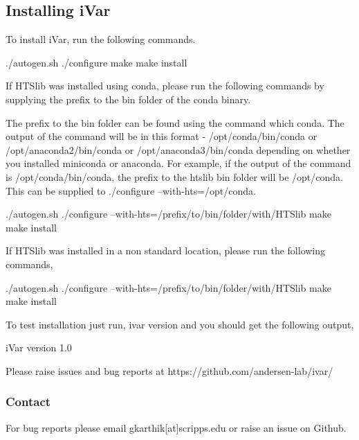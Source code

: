 \hypertarget{installpage_autotoc_md9}{}\subsection{Installing i\+Var}\label{installpage_autotoc_md9}
To install i\+Var, run the following commands.


\begin{DoxyCode}
./autogen.sh
./configure
make
make install
\end{DoxyCode}


If H\+T\+Slib was installed using conda, please run the following commands by supplying the prefix to the bin folder of the conda binary.

The prefix to the bin folder can be found using the command {\ttfamily which conda}. The output of the command will be in this format -\/ /opt/conda/bin/conda or /opt/anaconda2/bin/conda or /opt/anaconda3/bin/conda depending on whether you installed miniconda or anaconda. For example, if the output of the command is /opt/conda/bin/conda, the prefix to the htslib bin folder will be /opt/conda. This can be supplied to ./configure --with-\/hts=/opt/conda.


\begin{DoxyCode}
./autogen.sh
./configure --with-hts=/prefix/to/bin/folder/with/HTSlib
make
make install
\end{DoxyCode}


If H\+T\+Slib was installed in a non standard location, please run the following commands,


\begin{DoxyCode}
./autogen.sh
./configure --with-hts=/prefix/to/bin/folder/with/HTSlib
make
make install
\end{DoxyCode}


To test installation just run, {\ttfamily ivar version} and you should get the following output,


\begin{DoxyCode}
iVar version 1.0

Please raise issues and bug reports at https://github.com/andersen-lab/ivar/
\end{DoxyCode}


\subsubsection*{Contact}

For bug reports please email gkarthik\mbox{[}at\mbox{]}scripps.\+edu or raise an issue on Github. 